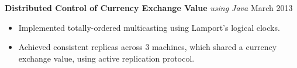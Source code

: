 \documentclass[10pt, a4paper]{article}
\begin{document}
\textbf{Distributed Control of Currency Exchange Value} \textit{using Java} \hfill March 2013
\begin{itemize}
    \item Implemented totally-ordered multicasting using Lamport's logical clocks. 
    \item Achieved consistent replicas across 3 machines, which shared a currency exchange value, using active replication protocol. %
\end{itemize}
\end{document}
